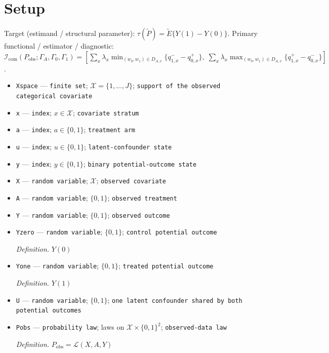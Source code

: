 \documentclass{article}
\begin{document}
\section{Setup}

Target (estimand / structural parameter): \(\tau(\widetilde P)=\widetilde E\{Y(1)-Y(0)\}\).
Primary functional / estimator / diagnostic: \(\mathcal I_{\mathrm{com}}(P_{\mathrm{obs}};\Gamma_A,\Gamma_0,\Gamma_1)=[\sum_x\lambda_x\min_{(w_0,w_1)\in D_{A,x}}\{q^-_{1,x}-q^+_{0,x}\},\;\sum_x\lambda_x\max_{(w_0,w_1)\in D_{A,x}}\{q^+_{1,x}-q^-_{0,x}\}]\).
\begin{itemize}
  \item \texttt{Xspace} --- \texttt{finite set}; \(\mathcal X=\{1,\ldots,J\}\); \texttt{support of the observed categorical covariate}
  \item \texttt{x} --- \texttt{index}; \(x\in\mathcal X\); \texttt{covariate stratum}
  \item \texttt{a} --- \texttt{index}; \(a\in\{0,1\}\); \texttt{treatment arm}
  \item \texttt{u} --- \texttt{index}; \(u\in\{0,1\}\); \texttt{latent-\allowbreak{}confounder state}
  \item \texttt{y} --- \texttt{index}; \(y\in\{0,1\}\); \texttt{binary potential-\allowbreak{}outcome state}
  \item \texttt{X} --- \texttt{random variable}; \(\mathcal X\); \texttt{observed covariate}
  \item \texttt{A} --- \texttt{random variable}; \(\{0,1\}\); \texttt{observed treatment}
  \item \texttt{Y} --- \texttt{random variable}; \(\{0,1\}\); \texttt{observed outcome}
  \item \texttt{Yzero} --- \texttt{random variable}; \(\{0,1\}\); \texttt{control potential outcome}
  \par\smallskip\noindent\emph{Definition.} \(Y(0)\)
  \item \texttt{Yone} --- \texttt{random variable}; \(\{0,1\}\); \texttt{treated potential outcome}
  \par\smallskip\noindent\emph{Definition.} \(Y(1)\)
  \item \texttt{U} --- \texttt{random variable}; \(\{0,1\}\); \texttt{one latent confounder shared by both potential outcomes}
  \item \texttt{Pobs} --- \texttt{probability law}; laws on \(\mathcal X\times\{0,1\}^2\); \texttt{observed-\allowbreak{}data law}
  \par\smallskip\noindent\emph{Definition.} \(P_{\mathrm{obs}}=\mathcal L(X,A,Y)\)

\end{itemize}
\end{document}
